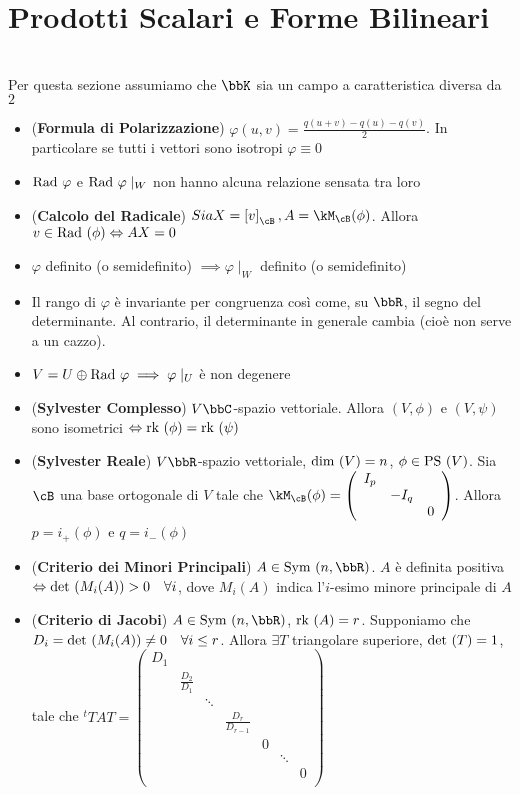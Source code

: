 \documentclass[a4paper,NoNotes,GeneralMath]{stdmdoc}
\newcommand{\mtrvec}[2]{\left[ {#1} \right]_{#2}}
\begin{document}
	\section*{Prodotti Scalari e Forme Bilineari}
	\Achtung \\ Per questa sezione assumiamo che $\bbK$ sia un campo a caratteristica diversa da $2$
	\begin{itemize}
		\item ({\bf Formula di Polarizzazione}) $\varphi(u,v) = \frac{q(u+v)-q(u)-q(v)}{2}$. In particolare se tutti i vettori sono isotropi $\varphi \equiv 0$
		\item $\mbox{Rad }\varphi$ e $\mbox{Rad }\varphi\mid_W$ non hanno alcuna relazione sensata tra loro
		\item ({\bf Calcolo del Radicale}) $Sia X = \mtrvec{v}{\cB}, A = \kM_{\cB}(\phi)$. Allora $v\in \mbox{Rad }(\phi) \Leftrightarrow AX = 0$
		\item $\varphi$ definito (o semidefinito) $\implies \varphi\mid_W$ definito (o semidefinito)
		\item Il rango di $\varphi$ è invariante per congruenza così come, su $\bbR$, il segno del determinante. Al contrario, il determinante in generale cambia (cioè non serve a un cazzo).
		\item $V = U \oplus \mbox{Rad }\varphi \implies \varphi\mid_U$ è non degenere
		\item ({\bf Sylvester Complesso}) $V \bbC$-spazio vettoriale. Allora $(V, \phi)$ e $(V, \psi)$ sono isometrici $\Leftrightarrow \mbox{rk }(\phi) = \mbox{rk }(\psi)$
		\item ({\bf Sylvester Reale}) $V \bbR$-spazio vettoriale, $\mbox{dim }(V) = n$, $\phi \in \mbox{PS }(V)$. Sia $\cB$ una base ortogonale di $V$ tale che $\kM_\cB(\phi) = \left( \begin{array}{ccc} I_p & & \\ & -I_q & \\ & & 0 \end{array} \right)$. Allora $p = i_{+}(\phi)$ e $q = i_{-}(\phi)$
		\item ({\bf Criterio dei Minori Principali}) $A \in \Symm(n,\bbR)$. $A$ è definita positiva $\Leftrightarrow \mbox{det }(M_i(A)) > 0 \quad \forall i$, dove $M_i(A)$ indica l'$i$-esimo minore principale di $A$
		\item ({\bf Criterio di Jacobi}) $A \in \Symm(n,\bbR)$, $\mbox{rk }(A) = r$. Supponiamo che $D_i = \mbox{det }(M_i(A)) \neq 0 \quad \forall i \le r$. Allora $\exists T$ triangolare superiore, $\mbox{det }(T) = 1$, tale che ${}^tTAT = \left( \begin{array}{ccccccc} D_1 & & & & & & \\ & \frac{D_2}{D_1} & & & & & \\ & & \ddots & & & & \\ & & & \frac{D_r}{D_{r-1}} & & & \\ & & & & 0 & & \\ & & & & & \ddots & \\ & & & & & & 0 \\ \end{array} \right)$

\end{itemize}
\end{document}

